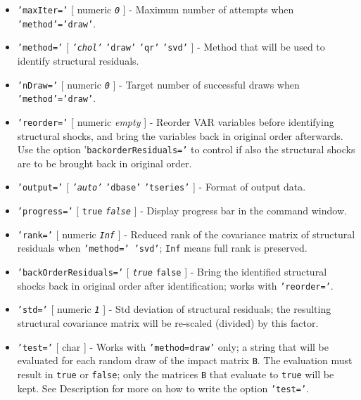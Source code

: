 \begin{itemize}
\item
  \texttt{'maxIter='} {[} numeric \textbar{} \emph{\texttt{0}} {]} -
  Maximum number of attempts when \texttt{'method'='draw'}.
\item
  \texttt{'method='} {[} \emph{\texttt{'chol'}} \textbar{}
  \texttt{'draw'} \textbar{} \texttt{'qr'} \textbar{} \texttt{'svd'} {]}
  - Method that will be used to identify structural residuals.
\item
  \texttt{'nDraw='} {[} numeric \textbar{} \emph{\texttt{0}} {]} -
  Target number of successful draws when \texttt{'method'='draw'}.
\item
  \texttt{'reorder='} {[} numeric \textbar{} \emph{empty} {]} - Reorder
  VAR variables before identifying structural shocks, and bring the
  variables back in original order afterwards. Use the option
  '\texttt{backorderResiduals='} to control if also the structural
  shocks are to be brought back in original order.
\item
  \texttt{'output='} {[} \emph{\texttt{'auto'}} \textbar{}
  \texttt{'dbase'} \textbar{} \texttt{'tseries'} {]} - Format of output
  data.
\item
  \texttt{'progress='} {[} \texttt{true} \textbar{}
  \emph{\texttt{false}} {]} - Display progress bar in the command
  window.
\item
  \texttt{'rank='} {[} numeric \textbar{} \emph{\texttt{Inf}} {]} -
  Reduced rank of the covariance matrix of structural residuals when
  \texttt{'method=' 'svd'}; \texttt{Inf} means full rank is preserved.
\item
  \texttt{'backOrderResiduals='} {[} \emph{\texttt{true}} \textbar{}
  \texttt{false} {]} - Bring the identified structural shocks back in
  original order after identification; works with \texttt{'reorder='}.
\item
  \texttt{'std='} {[} numeric \textbar{} \emph{\texttt{1}} {]} - Std
  deviation of structural residuals; the resulting structural covariance
  matrix will be re-scaled (divided) by this factor.
\item
  \texttt{'test='} {[} char {]} - Works with \texttt{'method=draw'}
  only; a string that will be evaluated for each random draw of the
  impact matrix \texttt{B}. The evaluation must result in \texttt{true}
  or \texttt{false}; only the matrices \texttt{B} that evaluate to
  \texttt{true} will be kept. See Description for more on how to write
  the option \texttt{'test='}.
\end{itemize}

